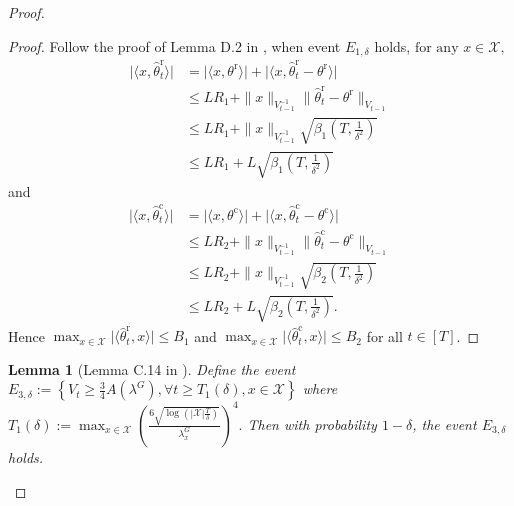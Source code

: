 \documentclass[accepted]{uai2025} %
\theoremstyle{plain}
\newtheorem{lemma}[theorem]{Lemma}
\theoremstyle{definition}
\theoremstyle{remark}
\newcommand{\thetac}{\theta^{\mathrm{c}}}
\newcommand{\thetar}{\theta^{\mathrm{r}}}
\newcommand{\hthetact}{\hat{\theta}_t^{\mathrm{c}}}
\newcommand{\hthetart}{\hat{\theta}_t^{\mathrm{r}}}
\newcommand{\cbr}[1]{\left\{#1\right\}}
\begin{document}
\begin{proof}
\begin{proof}
     Follow the proof of Lemma D.2 in \cite{li2024optimal}, when event $E_{1,\delta}$ holds,
    $\text{for any } x \in \mathcal{X}, $
\begin{align*}
   \lvert \langle x, \hthetart \rangle \rvert&= \lvert\langle x, \thetar \rangle\rvert + \lvert\langle x, \hthetart - \thetar \rangle \rvert\\
    &\leq L R_1 + \|x\|_{V_{t-1}^{-1}} \|\hthetart - \thetar\|_{V_{t-1}} \\
    &\leq L R_1 + \|x\|_{V_{t-1}^{-1}} \sqrt{\beta_1(T, \frac{1}{\delta^2})}
    \\&\leq L R_1 + L \sqrt{\beta_1(T, \frac{1}{\delta^2})}
\end{align*}
and
\begin{align*}
    \lvert\langle x, \hthetact \rangle \rvert &= \lvert\langle x, \thetac \rangle \rvert + \lvert\langle x, \hthetact - \thetac \rangle \rvert \\
    &\leq L R_2 + \|x\|_{V_{t-1}^{-1}} \|\hthetact - \thetac\|_{V_{t-1}} \\
    &\leq L R_2 + \|x\|_{V_{t-1}^{-1}} \sqrt{\beta_2(T, \frac{1}{\delta^2})}
    \\&\leq L R_2 + L \sqrt{\beta_2(T, \frac{1}{\delta^2})}.
\end{align*}
Hence $\max_{x\in \mathcal{X}} \lvert \langle \hthetart, x\rangle\rvert \le B_{1}$ and $\max_{x\in \mathcal{X}} \lvert \langle \hthetact, x\rangle\rvert \le B_{2}$ for all $t\in[T]$.
\end{proof}


\begin{lemma}[Lemma C.14 in \citet{li2024optimal}]
    Define the event $E_{3,\delta}:= \cbr{V_t \ge \frac{3}{4}A(\lambda^G), \forall t\ge T_1(\delta), x\in \mathcal{X}}$ where $T_1(\delta):=\max_{x \in \mathcal{X}} \left( \frac{6 \sqrt{\log(|\mathcal{X}|  \frac{T}{\delta})}}{\lambda_x^G} \right)^4.$
    Then with probability $1-\delta$, the event $E_{3,\delta}$ holds.
\end{lemma}


\end{proof}
\end{document}
